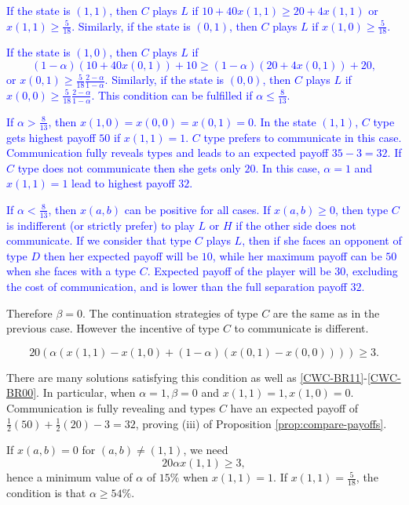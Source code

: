 \documentclass[12pt]{article}
\theoremstyle{break}
\begin{document}
\textcolor{blue}{If the state is $(1,1)$, then $C$ plays $L$ if $10+40x(1,1) \geq 20+4x(1,1)$ or $x(1,1)\geq \frac{5}{18}$. Similarly, if the state is $(0,1)$, then $C$ plays $L$ if $x(1,0)\geq \frac{5}{18}$.}

\textcolor{blue}{If the state is $(1,0)$, then $C$ plays $L$ if $$(1-\alpha)(10+40x(0,1))+10 \geq (1-\alpha)(20+4x(0,1))+20,$$ or $x(0,1)\geq \frac{5}{18}\frac{2-\alpha}{1-\alpha}$. Similarly, if the state is $(0,0)$, then $C$ plays $L$ if $x(0,0)\geq \frac{5}{18}\frac{2-\alpha}{1-\alpha}$. This condition can be fulfilled if $\alpha\leq \frac{8}{13}$.}

\textcolor{blue}{If $\alpha > \frac{8}{13}$, then $x(1,0)=x(0,0)=x(0,1)=0$. In the state $(1,1)$, $C$ type gets highest payoff $50$ if $x(1,1)=1$. $C$ type prefers to communicate in this case. Communication fully reveals types and leads to an expected payoff $35-3=32$. If $C$ type does not communicate then she gets only $20$. In this case, $\alpha = 1$ and $x(1,1)=1$ lead to highest payoff $32$.}

\textcolor{blue}{If $\alpha < \frac{8}{13}$, then $x(a,b)$ can be positive for all cases. If $x(a,b)\geq 0$, then type $C$ is indifferent (or strictly prefer) to play $L$ or $H$ if the other side does not communicate. If we consider that type $C$ plays $L$, then if she faces an opponent of type $D$ then her expected payoff will be $10$, while her maximum payoff can be $50$ when she faces with a type $C$. Expected payoff of the player will be $30$, excluding the cost of communication, and is lower than the full separation payoff $32$.}

Therefore $\beta=0$. The continuation strategies of type $C$ are the same as in the previous case. However the incentive of type $C$ to communicate is different.

\begin{equation}\label{ICcom-F50}
	20 (\alpha(x(1,1)-x(1,0)+(1-\alpha)(x(0,1)-x(0,0))))\geq 3.	
\end{equation}

There are many solutions satisfying this condition as well as \eqref{CWC-BR11}-\eqref{CWC-BR00}. In particular, when $\alpha=1, \beta=0$ and $x(1,1)=1,x(1,0)=0$. Communication is fully revealing and types $C$ have an expected payoff of $\frac{1}{2}(50)+\frac{1}{2}(20)-3=32$, proving (iii) of Proposition \ref{prop:compare-payoffs}.

If $x(a,b)=0$ for $(a,b)\neq (1,1)$, we need
\[
20 \alpha x(1,1)\geq 3,
\]
hence a minimum value of $\alpha$ of $15\%$ when $x(1,1)=1$. If $x(1,1)=\frac{5}{18}$, the condition is that $\alpha \geq 54\%$.
\end{document}

